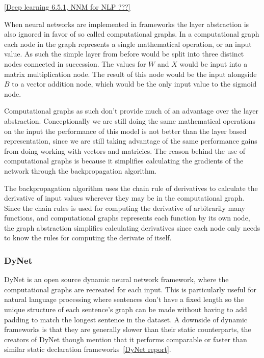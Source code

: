 \ref{Deep learning 6.5.1, NNM for NLP ???}

When neural networks are implemented in frameworks the layer abstraction is also
ignored in favor of so called computational graphs. In a computational graph
each node in the graph represents a single mathematical operation, or an input
value. As such the simple layer from before would be split into three distinct
nodes connected in succession. The values for $W$ and $X$ would be input into a
matrix multiplication node. The result of this node would be the input alongside
$B$ to a vector addition node, which would be the only input value to the
sigmoid node. 

Computational graphs as such don't provide much of an advantage over the layer
abstraction. Conceptionally we are still doing the same mathematical operations
on the input the performance of this model is not better than the layer based
representation, since we are still taking advantage of the same performance
gains from doing working with vectors and matricies. The reason behind the use
of computational graphs is because it simplifies calculating the gradients of
the network through the backpropagation algorithm. 

The backpropagation algorithm uses the chain rule of derivatives to calculate
the derivative of input values wherever they may be in the computational graph.
Since the chain rules is used for computing the derivative of arbitrarily many
functions, and computational graphs represents each function by its own node,
the graph abstraction simplifies calculating derivatives since each node only
needs to know the rules for computing the derivate of itself.
 

\subsubsection*{DyNet}

DyNet is an open source dynamic neural network framework, where the
computational graphs are recreated for each input. This is particularly useful
for natural language processing where sentences don't have a fixed length so the
unique structure of each sentence's graph can be made without having to add
padding to match the longest sentence in the dataset. A downside of dynamic
frameworks is that they are generally slower than their static counterparts,
the creators of DyNet though mention that it performs comparable or faster than
similar static declaration frameworks~\ref{DyNet report}.   

